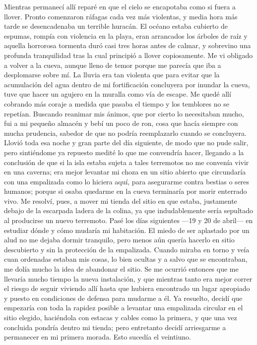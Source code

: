 \documentclass{novela}
\begin{document}
    Mientras permanecí allí reparé en que el cielo se encapotaba como si fuera a llover. Pronto comenzaron ráfagas cada vez más violentas, y media hora más tarde se desencadenaba un terrible huracán. El océano estaba cubierto de espumas, rompía con violencia en la playa, eran arrancados los árboles de raíz y aquella horrorosa tormenta duró casi tres horas antes de calmar, y sobrevino una profunda tranquilidad tras la cual principió a llover copiosamente.
    Me vi obligado a volver a la cueva, aunque lleno de temor porque me parecía que iba a desplomarse sobre mí. La lluvia era tan violenta que para evitar que la acumulación del agua dentro de mi fortificación concluyera por inundar la cueva, tuve que hacer un agujero en la muralla como vía de escape. Me quedé allí cobrando más coraje a medida que pasaba el tiempo y los temblores no se repetían. Buscando reanimar mis ánimos, que por cierto lo necesitaban mucho, fui a mi pequeño almacén y bebí un poco de ron, cosa que hacía siempre con mucha prudencia, sabedor de que no podría reemplazarlo cuando se concluyera.
    Llovió toda esa noche y gran parte del día siguiente, de modo que no pude salir, pero sintiéndome ya repuesto medité lo que me convendría hacer, llegando a la conclusión de que si la isla estaba sujeta a tales terremotos no me convenía vivir en una caverna; era mejor levantar mi choza en un sitio abierto que circundaría con una empalizada como lo hiciera aquí, para asegurarme contra bestias o seres humanos; porque si osaba quedarme en la cueva terminaría por morir enterrado vivo.
    Me resolví, pues, a mover mi tienda del sitio en que estaba, justamente debajo de la escarpada ladera de la colina, ya que indudablemente sería sepultado al producirse un nuevo terremoto. Pasé los días siguientes —19 y 20 de abril— en estudiar dónde y cómo mudaría mi habitación.
    El miedo de ser aplastado por un alud no me dejaba dormir tranquilo, pero menos aún quería hacerlo en sitio descubierto y sin la protección de la empalizada. Cuando miraba en torno y veía cuan ordenadas estaban mis cosas, lo bien ocultas y a salvo que se encontraban, me dolía mucho la idea de abandonar el sitio.
    Se me ocurrió entonces que me llevaría mucho tiempo la nueva instalación, y que mientras tanto era mejor correr el riesgo de seguir viviendo allí hasta que hubiera encontrado un lugar apropiado y puesto en condiciones de defensa para mudarme a él. Ya resuelto, decidí que empezaría con toda la rapidez posible a levantar una empalizada circular en el sitio elegido, haciéndola con estacas y cables como la primera, y que una vez concluida pondría dentro mi tienda; pero entretanto decidí arriesgarme a permanecer en mi primera morada. Esto sucedía el veintiuno.
\end{document}
